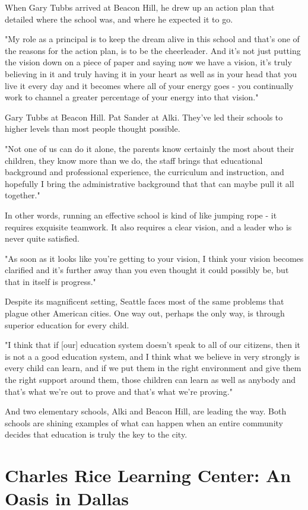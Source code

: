 When Gary Tubbs arrived at Beacon Hill, he drew up an action plan that detailed where the school was, and where he expected it to go.

"My role as a principal is to keep the dream alive in this school and that's one of the reasons for the action plan, is to be the cheerleader. And it's not just putting the vision down on a piece of paper and saying now we have a vision, it's truly believing in it and truly having it in your heart as well as in your head that you live it every day and it becomes where all of your energy goes - you continually work to channel a greater percentage of your energy into that vision."

Gary Tubbs at Beacon Hill. Pat Sander at Alki. They've led their schools to higher levels than most people thought possible.

"Not one of us can do it alone, the parents know certainly the most about their children, they know more than we do, the staff brings that educational background and professional experience, the curriculum and instruction, and hopefully I bring the administrative background that that can maybe pull it all together."

In other words, running an effective school is kind of like jumping rope - it requires exquisite teamwork. It also requires a clear vision, and a leader who is never quite satisfied.

"As soon as it looks like you're getting to your vision, I think your vision becomes clarified and it's further away than you even thought it could possibly be, but that in itself is progress."

Despite its magnificent setting, Seattle faces most of the same problems that plague other American cities. One way out, perhaps the only way, is through superior education for every child.

"I think that if [our] education system doesn't speak to all of our citizens, then it is not a a good education system, and I think what we believe in very strongly is every child can learn, and if we put them in the right environment and give them the right support around them, those children can learn as well as anybody and that's what we're out to prove and that's what we're proving."

And two elementary schools, Alki and Beacon Hill, are leading the way. Both schools are shining examples of what can happen when an entire community decides that education is truly the key to the city.

\section{Charles Rice Learning Center: An Oasis in Dallas}

